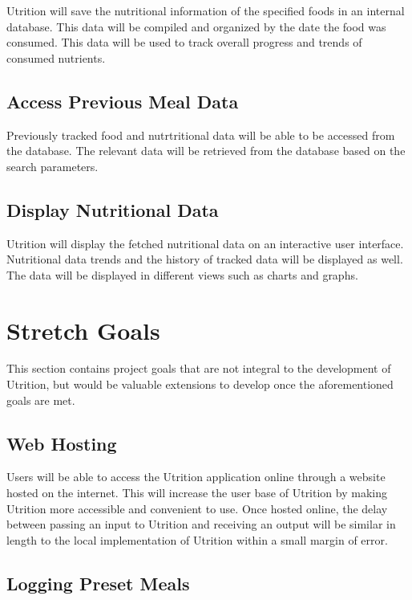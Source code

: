 \documentclass{article}
\begin{document}
Utrition will save the nutritional information of the specified foods in an internal database. This data will be compiled and organized by the date the food was consumed. This data will be used to track overall progress and trends of consumed nutrients.

\subsection{Access Previous Meal Data}

Previously tracked food and nutrtritional data will be able to be accessed from the database. The relevant data will be retrieved from the database based on the search parameters.

\subsection{Display Nutritional Data}

Utrition will display the fetched nutritional data on an interactive user interface. Nutritional data trends and the history of tracked data will be displayed as well. The data will be displayed in different views such as charts and graphs. 

\section{Stretch Goals}

This section contains project goals that are not integral to the development of Utrition, but would be valuable extensions to develop once the aforementioned goals are met.

\subsection{Web Hosting}

Users will be able to access the Utrition application online through a website hosted on the internet. This will increase the user base of Utrition by making Utrition more accessible and convenient to use. Once hosted online, the delay between passing an input to Utrition and receiving an output will be similar in length to the local implementation of Utrition within a small margin of error.

\subsection{Logging Preset Meals}
\end{document}
